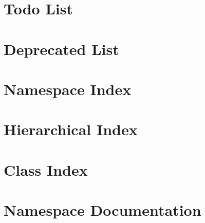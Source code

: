 \documentclass[twoside]{book}
\begin{document}
\chapter{Todo List}
\label{todo}
\hypertarget{todo}{}

\chapter{Deprecated List}
\label{deprecated}
\hypertarget{deprecated}{}

\chapter{Namespace Index}

\chapter{Hierarchical Index}

\chapter{Class Index}

\chapter{Namespace Documentation}



\end{document}
